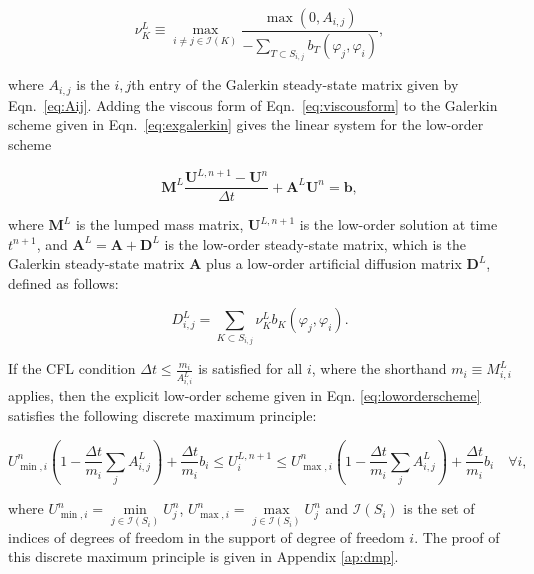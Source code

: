 \begin{equation}
   \nu_K^L \equiv \max\limits_{i\ne j\in \mathcal{I}(K)}\frac{\max(0,A_{i,j})}
      {-\sum\limits_{T\subset S_{i,j}} b_T(\varphi_j, \varphi_i)},
\end{equation}

\noindent
where $A_{i,j}$ is the $i,j$th entry of the Galerkin steady-state
matrix given by Eqn.~\ref{eq:Aij}.
Adding the viscous form of Eqn.~\ref{eq:viscousform} to the Galerkin scheme given in
Eqn.~\ref{eq:exgalerkin} gives the linear system for the low-order scheme

\begin{equation}\label{eq:loworderscheme}
   \mathbf{M}^L\frac{\mathbf{U}^{L,n+1}-\mathbf{U}^n}{\Delta t}
      +\mathbf{A}^L\mathbf{U}^n = \mathbf{b},
\end{equation}

\noindent
where $\mathbf{M}^L$ is the lumped mass matrix,
$\mathbf{U}^{L,n+1}$ is the low-order solution at time $t^{n+1}$, and
$\mathbf{A}^L = \mathbf{A} + \mathbf{D}^L$ is the low-order steady-state matrix,
which is the Galerkin steady-state matrix $\mathbf{A}$ plus a low-order
artificial diffusion matrix $\mathbf{D}^L$, defined as follows:

\begin{equation}\label{eq:loworderD}
   D^L_{i,j} = \sum\limits_{K\subset S_{i,j}}\nu_K^L b_K(\varphi_j,\varphi_i).
\end{equation}

\noindent
If the CFL condition $\Delta t \leq \frac{m_i}{A_{i,i}^L}$
is satisfied for all $i$, where the shorthand $m_i\equiv M^L_{i,i}$ applies, then the explicit
low-order scheme given in Eqn. \ref{eq:loworderscheme} satisfies the following
discrete maximum principle:

\begin{equation}\label{eq:dmp}
   U_{\min,i}^n\left(1-\frac{\Delta t}{m_i}
      \sum\limits_j A^L_{i,j}\right)
      + \frac{\Delta t}{m_i}b_i\leq
   U_i^{L,n+1}\leq
   U_{\max,i}^n\left(1-\frac{\Delta t}{m_i}
      \sum\limits_j A^L_{i,j}\right)
      + \frac{\Delta t}{m_i}b_i\quad\forall i,
\end{equation}

\noindent
where $U_{\min,i}^n = \min\limits_{j\in \mathcal{I}(S_i)}U_j^n$,
$U_{\max,i}^n = \max\limits_{j\in \mathcal{I}(S_i)}U_j^n$
and $\mathcal{I}(S_i)$ is the set of indices of degrees of freedom in the
support of degree of freedom $i$. The proof of this discrete maximum
principle is given in Appendix \ref{ap:dmp}.

